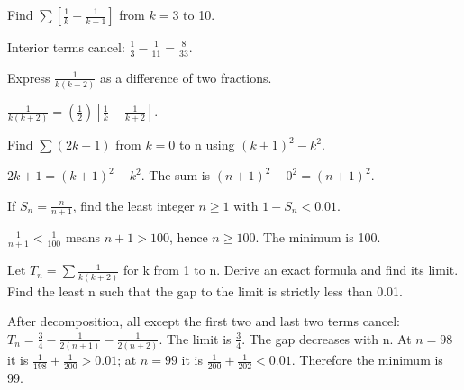 \documentclass[11pt]{article}
\begin{document}
Find \(\sum [\frac{1}{k}-\frac{1}{k+1}]\) from \(k=3\) to 10.\par
Interior terms cancel: \(\frac{1}{3}-\frac{1}{11}=\frac{8}{33}\).\par
{}
Express \(\frac{1}{k(k+2)}\) as a difference of two fractions.\par
\(\frac{1}{k(k+2)}=(\frac{1}{2})[\frac{1}{k}-\frac{1}{k+2}]\).\par
{}
Find \(\sum (2k+1)\) from \(k=0\) to n using \((k+1)^{2}-k^{2}\).\par
\(2k+1=(k+1)^{2}-k^{2}\). The sum is \((n+1)^{2}-0^{2}=(n+1)^{2}\).\par
{}
If \(S_{n}=\frac{n}{n+1}\), find the least integer \(n\geq 1\) with \(1-S_{n}<0.01\).\par
\(\frac{1}{n+1}<\frac{1}{100}\) means \(n+1>100\), hence \(n\geq 100\). The minimum is 100.\par
{}
Let \(T_{n}=\sum  \frac{1}{k(k+2)}\) for k from 1 to n. Derive an exact formula and find its limit. Find the least n such that the gap to the limit is strictly less than 0.01.\par
After decomposition, all except the first two and last two terms cancel: \(T_{n}=\frac{3}{4}-\frac{1}{2(n+1)}-\frac{1}{2(n+2)}\). The limit is \(\frac{3}{4}\). The gap decreases with n. At \(n=98\) it is \(\frac{1}{198}+\frac{1}{200}>0.01\); at \(n=99\) it is \(\frac{1}{200}+\frac{1}{202}<0.01\). Therefore the minimum is 99.\par
\end{document}
